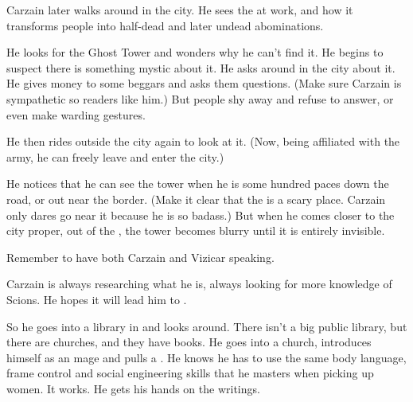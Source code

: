 \begin{comment}
  \subsection{Carzain sees Morbus but not Tower}
\end{comment}
\new
Carzain later walks around in the city. He sees the  at work, and how it transforms people into half-dead and later undead abominations. 

He looks for the Ghost Tower and wonders why he can't find it. 
He begins to suspect there is something mystic about it. 
He asks around in the city about it.
He gives money to some beggars and asks them questions. 
(Make sure Carzain is sympathetic so readers like him.)
But people shy away and refuse to answer, or even make warding gestures. 


He then rides outside the city again to look at it.
(Now, being affiliated with the army, he can freely leave and enter the city.)

He notices that he can see the tower when he is some hundred paces down the road, or out near the \wylde border. 
(Make it clear that the \wylde is a scary place. Carzain only dares go near it because he is so badass.)
But when he comes closer to the city proper, out of the \wylde, the tower becomes blurry until it is entirely invisible. 


Remember to have both Carzain and Vizicar speaking. 







\begin{comment}
  \subsection{Carzain reads about Scions}
\end{comment}
\new
Carzain is always researching what he is, always looking for more knowledge of Scions. 
He hopes it will lead him to \apotheosis. 

So he goes into a library in \Forclin{} and looks around. 
There isn't a big public library, but there are churches, and they have books. 
He goes into a church, introduces himself as an \ishrah{} mage and pulls a .
He knows he has to use the same body language, frame control and social engineering skills that he masters when picking up women.
It works.
He gets his hands on the writings.


